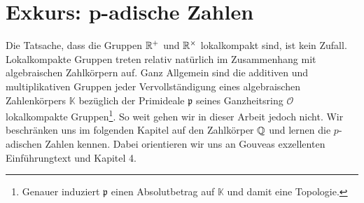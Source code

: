 \section{Exkurs: p-adische Zahlen}\label{sec:padisch}
	Die Tatsache, dass die Gruppen $\mathbb{R}^+$ und $\mathbb{R}^\times$ lokalkompakt sind, ist kein Zufall.
	Lokalkompakte Gruppen treten relativ natürlich im Zusammenhang mit algebraischen Zahlkörpern auf.
	Ganz Allgemein sind die additiven und multiplikativen Gruppen jeder Vervollständigung eines algebraischen Zahlenkörpers $\mathbb{K}$ bezüglich der Primideale $\mathfrak{p}$ seines Ganzheitsring $\mathcal{O}$ lokalkompakte Gruppen\footnote{Genauer induziert $\mathfrak{p}$ einen Absolutbetrag auf $\mathbb{K}$ und damit eine Topologie.}.
	So weit gehen wir in dieser Arbeit jedoch nicht. 
	Wir beschränken uns im folgenden Kapitel auf den Zahlkörper $\mathbb{Q}$ und lernen die $p$-adischen Zahlen kennen.
	Dabei orientieren wir uns an Gouveas exzellenten Einführungtext \cite{gouv} und \textcite{deitmar2010} Kapitel 4.
